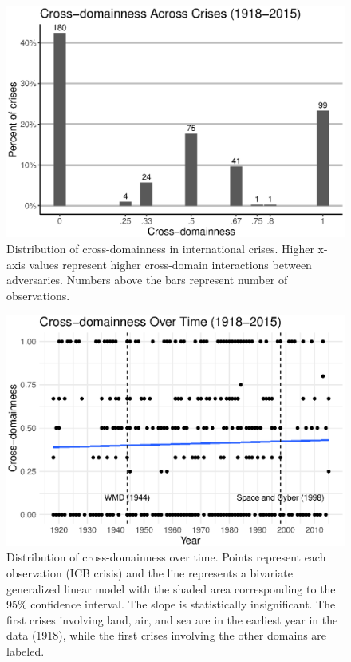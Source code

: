 \documentclass[
]{article}
\begin{document}
\begin{figure}[h!]

{\centering \includegraphics[width=0.8\linewidth,]{2022-05-03_ICB-Domains_files/figure-latex/fig-2-1} 

}

\caption{Distribution of cross-domainness in international crises. Higher x-axis values represent higher cross-domain interactions between adversaries. Numbers above the bars represent number of observations.}\label{fig:fig-2}
\end{figure}

\begin{figure}[h!]

{\centering \includegraphics[width=0.8\linewidth,]{2022-05-03_ICB-Domains_files/figure-latex/fig-3-1} 

}

\caption{Distribution of cross-domainness over time. Points represent each observation (ICB crisis) and the line represents a bivariate generalized linear model with the shaded area corresponding to the 95\% confidence interval. The slope is statistically insignificant. The first crises involving land, air, and sea are in the earliest year in the data (1918), while the first crises involving the other domains are labeled.}\label{fig:fig-3}
\end{figure}
\end{document}
